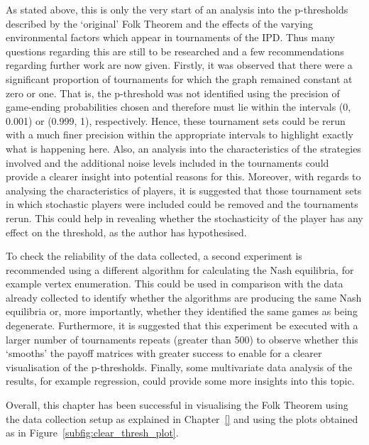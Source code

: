 As stated above, this is only the very start of an analysis into the
p-thresholds described by the `original' Folk Theorem and the effects of the
varying environmental factors which appear in tournaments of the IPD. Thus many
questions regarding this are still to be researched and a few recommendations
regarding further work are now given. Firstly, it was observed that there were a
significant proportion of tournaments for which the graph remained constant at
zero or one. That is, the p-threshold was not identified using the precision of
game-ending probabilities chosen and therefore must lie within the intervals (0,
0.001) or (0.999, 1), respectively. Hence, these tournament sets could be rerun
with a much finer precision within the appropriate intervals to highlight
exactly what is happening here. Also, an analysis into the characteristics of
the strategies involved and the additional noise levels included in the
tournaments could provide a clearer insight into potential reasons for this.
Moreover, with regards to analysing the characteristics of players, it is
suggested that those tournament sets in which stochastic players were included
could be removed and the tournaments rerun. This could help in revealing whether
the stochasticity of the player has any effect on the threshold, as the author
has hypothesised. 

To check the reliability of the data collected, a second
experiment is recommended using a different algorithm for calculating the Nash
equilibria, for example vertex enumeration. This could be used in comparison
with the data already collected to identify whether the algorithms are producing
the same Nash equilibria or, more importantly, whether they identified the same
games as being degenerate. Furthermore, it is suggested that this experiment be
executed with a larger number of tournaments repeats (greater than 500) to
observe whether this `smooths' the payoff matrices with greater success to
enable for a clearer visualisation of the p-thresholds. Finally, some
multivariate data analysis of the results, for example regression, could provide
some more insights into this topic.

Overall, this chapter has been successful in visualising the Folk Theorem using
the data collection setup as explained in Chapter~\ref{} and using the plots
obtained as in Figure~\ref{subfig:clear_thresh_plot}.
